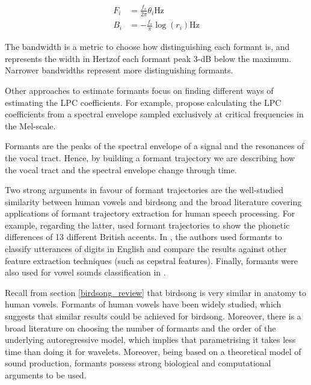 \documentclass[../main.tex]{subfiles} \label{chapter_soa}
\begin{document}
\begin{align*}
F_i &= \frac{f_s}{2\pi}\theta_i \text{Hz}\\
B_i &= -\frac{f_s}{\pi}\log{(r_i)} \text{Hz}
\end{align*}
\par The bandwidth is a metric to choose how distinguishing each formant is, and represents the width in Hertzof each formant peak 3-dB below the maximum. Narrower bandwidths represent more distinguishing formants. 
\par Other approaches to estimate formants focus on finding different ways of estimating the LPC coefficients. For example, \cite{Darch,Araujo1998} propose calculating the LPC coefficients from a spectral envelope sampled exclusively at critical frequencies in the Mel-scale.
\par Formants are the peaks of the spectral envelope of a signal and the resonances of the vocal tract. Hence, by building a formant trajectory we are describing how the vocal tract and the spectral envelope change through time.
\par Two strong arguments in favour of formant trajectories are the well-studied similarity between human vowels and birdsong and the broad literature covering applications of formant trajectory extraction for human speech processing. For example, regarding the latter, \cite{Ferragne2010} used formant trajectories to show the phonetic differences of 13 different British accents. In \cite{Holmes1895}, the authors used formants to classify utterances of digits in English and compare the results against other feature extraction techniques (such as cepstral features). Finally, formants were also used for vowel sounds classification in \cite{markel1976}.
\par Recall from section \ref{birdsong_review} that birdsong is very similar in anatomy to human vowels. Formants of human vowels have been widely studied, which suggests that similar results could be achieved for birdsong. Moreover, there is a broad literature on choosing the number of formants and the order of the underlying autoregressive model, which implies that parametrising it takes less time than doing it for wavelets. Moreover, being based on a theoretical model of sound production, formants possess strong biological and computational arguments to be used.
\end{document}
